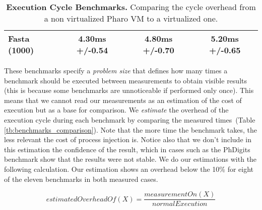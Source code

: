 \begin{table}[ht]
\begin{tabular}{lccc}
		Fasta (1000) & 4.30ms +/-0.54 & 4.80ms +/-0.70 & 5.20ms +/-0.65 \\\bottomrule%
 	\end{tabular}
	\vspace*{0.2cm}
 	\caption{\textbf{Execution Cycle Benchmarks.} Comparing the cycle overhead from a non virtualized Pharo VM to a virtualized one.\label{tb:benchmarks}}
 \end{table}
 
These benchmarks specify a \emph{problem size} that defines how many times a benchmark should be executed between measurements to obtain visible results (this is because some benchmarks are unnoticeable if performed only once). This means that we cannot read our measurements as an estimation of the cost of execution but as a base for comparison. We \emph{estimate} the overhead of the execution cycle during each benchmark by comparing the measured times~(Table \ref{tb:benchmarks_comparison}). Note that the more time the benchmark takes, the less relevant the cost of process injection is. Notice also that we don't include in this estimation the confidence of the result, which in cases such as the PhDigits benchmark show that the results were not stable. We do our estimations with the following calculation. Our estimation shows an overhead below the 10\% for eight of the eleven benchmarks in both measured cases.

\begin{equation*}
estimatedOverheadOf(X) = \frac{measurementOn(X)}{normalExecution}
\end{equation*}

